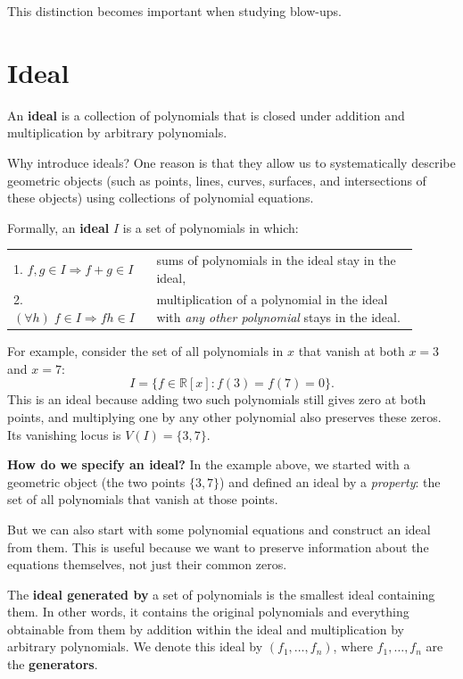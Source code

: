 \documentclass[12pt]{article}
\begin{document}
This distinction becomes important when studying blow-ups.

\newpage
\section{Ideal}\label{ideal}

An \textbf{ideal} is a collection of polynomials that is closed under
addition and multiplication by arbitrary polynomials.

Why introduce ideals? One reason is that they allow us to systematically
describe geometric objects (such as points, lines, curves, surfaces,
and intersections of these objects) using collections of polynomial
equations.

Formally, an \textbf{ideal} $I$ is a set of polynomials in which:
\begin{center}
    \begin{tabular}{p{0.3\linewidth} p{0.6\linewidth}}
        1.\; $f,g\in I \Rightarrow f+g\in I$
        & sums of polynomials in the ideal stay in the ideal, \\[0.7em]
        2.\; $(\forall h)\; f\in I \Rightarrow fh\in I$
        & multiplication of a polynomial in the ideal with
        \emph{any other polynomial} stays in the ideal.
    \end{tabular}
\end{center}

For example, consider the set of all polynomials in $x$ that
vanish at both $x=3$ and $x=7$:
\[
I=\{f\in\mathbb{R}[x]:f(3)=f(7)=0\}.
\]
This is an ideal because adding two such polynomials still
gives zero at both points, and multiplying one by any other
polynomial also preserves these zeros. Its vanishing locus is $V(I)=\{3,7\}$.

\textbf{How do we specify an ideal?}
In the example above, we started with a geometric object
(the two points $\{3,7\}$) and defined an ideal by a
\emph{property}: the set of all polynomials that vanish at
those points.

But we can also start with
some polynomial equations and construct an ideal from them.
This is useful because we want to preserve information about
the equations themselves, not just their common zeros.

The \textbf{ideal generated by} a set of polynomials is the
smallest ideal containing them. In other words, it contains
the original polynomials and everything obtainable from them
by addition within the ideal and multiplication by arbitrary polynomials.
We denote this ideal by $(f_1,\ldots,f_n)$, where
$f_1,\ldots,f_n$ are the \textbf{generators}.
\end{document}
